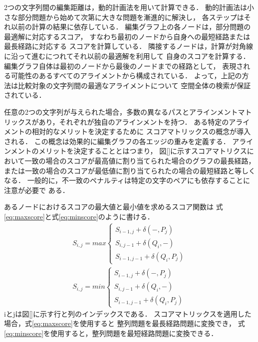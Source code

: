 2つの文字列間の編集距離は，動的計画法を用いて計算できる．
動的計画法は小さな部分問題から始めて次第に大きな問題を漸進的に解決し，
各ステップはそれ以前の計算の結果に依存している．
編集グラフ上の各ノードは，部分問題の最適解に対応するスコア，
すなわち最初のノードから自身への最短経路または最長経路に対応する
スコアを計算している．
隣接するノードは，計算が対角線に沿って進むにつれてそれ以前の最適解を利用して
自身のスコアを計算する．
編集グラフ自体は最初のノードから最後のノードまでの経路として，
表現される可能性のあるすべてのアライメントから構成されている．
よって，上記の方法は比較対象の文字列間の最適なアライメントについて
空間全体の検索が保証されている．

任意の2つの文字列が与えられた場合，多数の異なるパスとアラインメントマトリックスがあり，それぞれが独自のアラインメントを持つ．
ある特定のアライメントの相対的なメリットを決定するために
スコアマトリックスの概念が導入される．
この概念は効果的に編集グラフの各エッジの重みを定義する．
アラインメントのメリットを決定することとはつまり，
図\ref{}に示すスコアマトリクスにおいて一致の場合のスコアが最高値に割り当てられた場合のグラフの最長経路，
または一致の場合のスコアが最低値に割り当てられたの場合の最短経路と等しくなる．
一般的に，不一致のペナルティは特定の文字のペアにも依存することに注意が必要で
ある．

あるノードにおけるスコアの最大値と最小値を求めるスコア関数は
式\ref{eq:maxscore}と式\ref{eq:minscore}のように書ける．
\begin{subequations}
\begin{align}
S_{i,j}= max \left \{
\begin{array}{l}
S_{i-1,j}+\delta(-,P_{j}) \\
S_{i,j-1}+\delta(Q_{i},-) \\
S_{i-1,j-1}+\delta(Q_{i},P_{j})
\end{array}
\right.\label{eq:maxscore} \\
S_{i,j}= min \left \{
\begin{array}{l}
S_{i-1,j}+\delta(-,P_{j}) \\
S_{i,j-1}+\delta(Q_{i},-) \\
S_{i-1,j-1}+\delta(Q_{i},P_{j})
\end{array}
\right.\label{eq:minscore}
\end{align}
\label{eq:minmaxscore}
\end{subequations}
iとjは図\ref{}に示す行と列のインデックスである．
スコアマトリックスを適用した場合，式\ref{eq:maxscore}を使用すると
整列問題を最長経路問題に変換でき，
式\ref{eq:minscore}を使用すると，整列問題を最短経路問題に変換できる．

